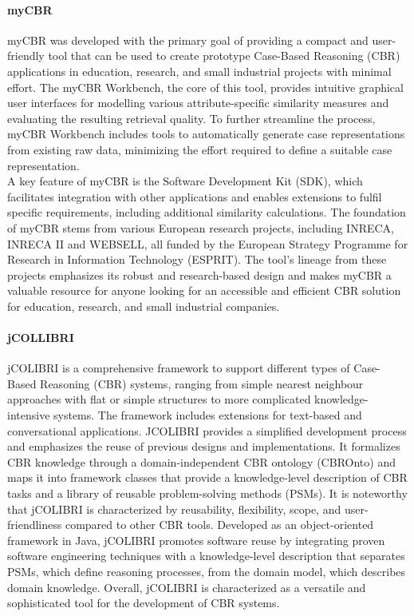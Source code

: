             \paragraph{myCBR}
            myCBR was developed with the primary goal of providing a compact and user-friendly tool that can be used to create prototype Case-Based Reasoning (CBR) applications in education, research, and small industrial projects with minimal effort. The myCBR Workbench, the core of this tool, provides intuitive graphical user interfaces for modelling various attribute-specific similarity measures and evaluating the resulting retrieval quality. To further streamline the process, myCBR Workbench includes tools to automatically generate case representations from existing raw data, minimizing the effort required to define a suitable case representation.\\
            A key feature of myCBR is the Software Development Kit (SDK), which facilitates integration with other applications and enables extensions to fulfil specific requirements, including additional similarity calculations. The foundation of myCBR stems from various European research projects, including INRECA, INRECA II and WEBSELL, all funded by the European Strategy Programme for Research in Information Technology (ESPRIT). The tool's lineage from these projects emphasizes its robust and research-based design and makes myCBR a valuable resource for anyone looking for an accessible and efficient CBR solution for education, research, and small industrial companies.

        
            \paragraph{jCOLLIBRI}
            jCOLIBRI is a comprehensive framework to support different types of Case-Based Reasoning (CBR) systems, ranging from simple nearest neighbour approaches with flat or simple structures to more complicated knowledge-intensive systems. The framework includes extensions for text-based and conversational applications. JCOLIBRI provides a simplified development process and emphasizes the reuse of previous designs and implementations. It formalizes CBR knowledge through a domain-independent CBR ontology (CBROnto) and maps it into framework classes that provide a knowledge-level description of CBR tasks and a library of reusable problem-solving methods (PSMs). It is noteworthy that jCOLIBRI is characterized by reusability, flexibility, scope, and user-friendliness compared to other CBR tools. Developed as an object-oriented framework in Java, jCOLIBRI promotes software reuse by integrating proven software engineering techniques with a knowledge-level description that separates PSMs, which define reasoning processes, from the domain model, which describes domain knowledge. Overall, jCOLIBRI is characterized as a versatile and sophisticated tool for the development of CBR systems.

